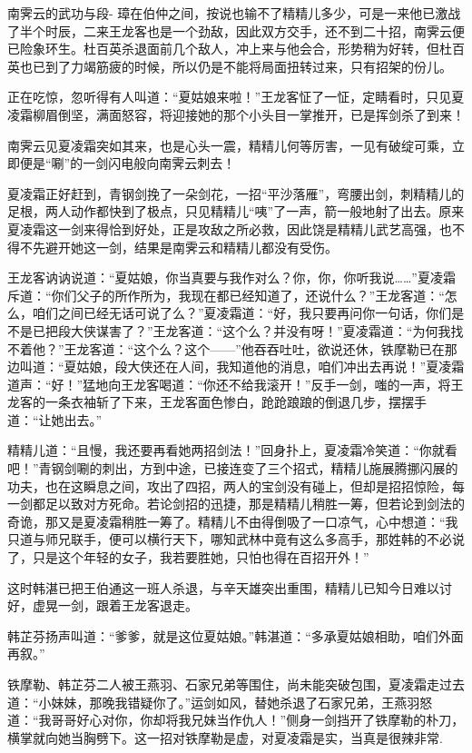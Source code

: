 \documentclass[12pt,oneside]{book}
\begin{document}
南霁云的武功与段-
璋在伯仲之间，按说也输不了精精儿多少，可是一来他已激战了半个时辰，二来王龙客也是一个劲敌，因此双方交手，还不到二十招，南霁云便已险象环生。杜百英杀退面前几个敌人，冲上来与他会合，形势稍为好转，但杜百英也已到了力竭筋疲的时候，所以仍是不能将局面扭转过来，只有招架的份儿。

正在吃惊，忽听得有人叫道：``夏姑娘来啦！''王龙客怔了一怔，定睛看时，只见夏凌霜柳眉倒坚，满面怒容，将迎接她的那个小头目一掌推开，已是挥剑杀了到来！

南霁云见夏凌霜突如其来，也是心头一震，精精儿何等厉害，一见有破绽可乘，立即便是``唰''的一剑闪电般向南霁云刺去！

夏凌霜正好赶到，青钢剑挽了一朵剑花，一招``平沙落雁''，弯腰出剑，刺精精儿的足根，两人动作都快到了极点，只见精精儿``咦''了一声，箭一般地射了出去。原来夏凌霜这一剑来得恰到好处，正是攻敌之所必救，因此饶是精精儿武艺高强，也不得不先避开她这一剑，结果是南霁云和精精儿都没有受伤。

王龙客讷讷说道：``夏姑娘，你当真要与我作对么？你，你，你听我说\ldots\ldots{}''夏凌霜斥道：``你们父子的所作所为，我现在都已经知道了，还说什么？''王龙客道：``怎么，咱们之间已经无话可说了么？''夏凌霜道：``好，我只要再问你一句话，你们是不是已把段大侠谋害了？''王龙客道：``这个么？并没有呀！''夏凌霜道：``为何我找不着他？''王龙客道：``这个么？这个------''他吞吞吐吐，欲说还休，铁摩勒已在那边叫道：``夏姑娘，段大侠还在人间，我知道他的消息，咱们冲出去再说！''夏凌霜道声：``好！''猛地向王龙客喝道：``你还不给我滚开！''反手一剑，嗤的一声，将王龙客的一条衣袖斩了下来，王龙客面色惨白，跄跄踉踉的倒退几步，摆摆手道：``让她出去。''

精精儿道：``且慢，我还要再看她两招剑法！''回身扑上，夏凌霜冷笑道：``你就看吧！''青钢剑唰的刺出，方到中途，已接连变了三个招式，精精儿施展腾挪闪展的功夫，也在这瞬息之间，攻出了四招，两人的宝剑没有碰上，但却是招招惊险，每一剑都足以致对方死命。若论剑招的迅捷，那是精精儿稍胜一筹，但若论到剑法的奇诡，那又是夏凌霜稍胜一筹了。精精儿不由得倒吸了一口凉气，心中想道：``我只道与师兄联手，便可以横行天下，哪知武林中竟有这么多高手，那姓韩的不必说了，只是这个年轻的女子，我若要胜她，只怕也得在百招开外！''

这时韩湛已把王伯通这一班人杀退，与辛天雄突出重围，精精儿已知今日难以讨好，虚晃一剑，跟着王龙客退走。

韩芷芬扬声叫道：``爹爹，就是这位夏姑娘。''韩湛道：``多承夏姑娘相助，咱们外面再叙。''

铁摩勒、韩芷芬二人被王燕羽、石家兄弟等围住，尚未能突破包围，夏凌霜走过去道：``小妹妹，那晚我错疑你了。''运剑如风，替她杀退了石家兄弟，王燕羽怒道：``我哥哥好心对你，你却将我兄妹当作仇人！''侧身一剑挡开了铁摩勒的朴刀，横掌就向她当胸劈下。这一招对铁摩勒是虚，对夏凌霜是实，当真是很辣非常.
\end{document}
